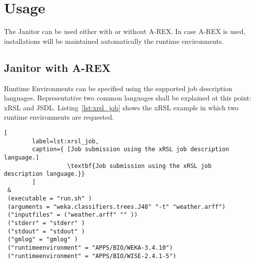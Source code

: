 \chapter{Usage}

The Janitor can be used either with or without A-REX. In case A-REX is used, installations will be maintained automatically the runtime environments.

\section{Janitor with A-REX}

Runtime Environments can be specified using the supported job description languages.
Representative two common languages shall be explained at this point: xRSL and JSDL.
Listing~\ref{lst:xrsl_job} shows the xRSL example in which two runtime environments are requested.

\begin{lstlisting}[
        label=lst:xrsl_job,
        caption={ [Job submission using the xRSL job description language.]
                  \textbf{Job submission using the xRSL job description language.}}
        ]
 &
 (executable = "run.sh" )
 (arguments = "weka.classifiers.trees.J48" "-t" "weather.arff")
 ("inputfiles" = ("weather.arff" "" ))
 ("stderr" = "stderr" )
 ("stdout" = "stdout" )
 ("gmlog" = "gmlog" )
 ("runtimeenvironment" = "APPS/BIO/WEKA-3.4.10")
 ("runtimeenvironment" = "APPS/BIO/WISE-2.4.1-5")
\end{lstlisting}

